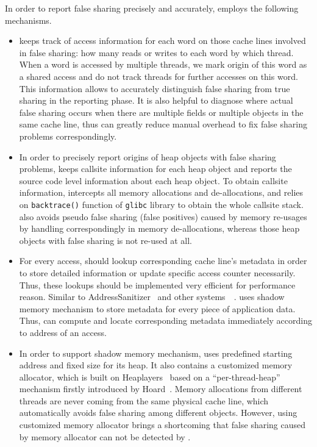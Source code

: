 In order to report false sharing precisely and accurately,  
\Predator{} employs the following mechanisms. 
\begin{itemize}
\item
\Predator{} keeps track of access information for each word on those
cache lines involved in false sharing: 
how many reads or writes to each word by which thread. 
When a word is accessed by multiple threads,
we mark origin of this word as a shared access and do not track threads for further accesses 
on this word. This information 
allows \Predator{} to accurately distinguish false sharing from true sharing 
in the reporting phase.
It is also helpful to diagnose where 
actual false sharing occurs when there are multiple fields or multiple objects 
in the same cache line, thus can greatly reduce manual overhead to fix false sharing problems
correspondingly. 

\item
In order to precisely report origins of heap objects with false sharing problems, \Predator{}
keeps callsite information for each heap object and reports the source code level
information about each heap object. To obtain callsite information, \Predator{}
intercepts all memory allocations and de-allocations, and relies on \texttt{backtrace()} 
function of \texttt{glibc} library to obtain the whole callsite stack. 
\Predator{} also avoids pseudo false sharing (false positives) caused by memory re-usages 
by handling correspondingly in memory de-allocations, whereas those heap objects with false 
sharing is not re-used at all.

\item
For every access, \Predator{} should lookup corresponding cache line's metadata 
in order to store detailed information or update specific access counter necessarily.
Thus, these lookups should be implemented very efficient for performance reason. 
Similar to 
AddressSanitizer~\cite{Addresssanitizer} and other systems~\cite{qinzhaodetection}~\cite{Valgrind}. 
\Predator{} uses shadow memory mechanism to store metadata for every piece of application data. 
Thus, \Predator{} can compute and locate corresponding metadata immediately according to address of
an access.

\item
In order to support shadow memory mechanism, \Predator{} uses predefined starting address and 
fixed size for its heap. 
It also contains a customized memory allocator, which is built on 
Heaplayers~\cite{heaplayers} based on a ``per-thread-heap'' mechanism firstly introduced 
by Hoard~\cite{Hoard}. 
Memory allocations from different threads are never coming 
from the same physical cache line, which automatically avoids false sharing among different objects. 
However, using customized memory allocator 
brings a shortcoming that false sharing caused by memory 
allocator can not be detected by \Predator{}. 

\end{itemize} 
 

